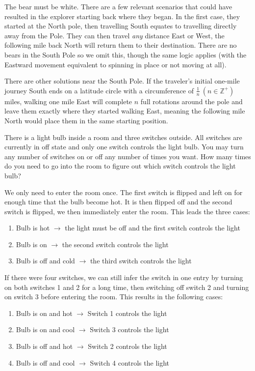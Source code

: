 \begin{solution}
The bear must be white. There are a few relevant scenarios that could have resulted in the explorer starting back where they began. In the first case, they started at the North pole, then travelling South equates to travelling directly away from the Pole. They can then travel \textit{any} distance East or West, the following mile back North will return them to their destination. There are no bears in the South Pole so we omit this, though the same logic applies (with the Eastward movement equivalent to spinning in place or not moving at all).

There are other solutions near the South Pole. If the traveler's initial one-mile journey South ends on a latitude circle with a circumference of $\frac{1}{n}\  (n \in \mathbb{Z}^+)$ miles, walking one mile East will complete $n$ full rotations around the pole and leave them exactly where they started walking East, meaning the following mile North would place them in the same starting position.
\end{solution}

\begin{problem}[Easy]
There is a light bulb inside a room and three switches outside. All switches are currently in off state and only one switch controls the light bulb. You may turn any number of switches on or off any number of times you want. How many times do you need to go into the room to figure out which switch controls the light bulb?
\end{problem}

\begin{solution}
We only need to enter the room once. The first switch is flipped and left on for enough time that the bulb become hot. It is then flipped off and the second switch is flipped, we then immediately enter the room. This leads the three cases:
\begin{enumerate}
    \item Bulb is hot $\rightarrow$ the light must be off and the first switch controls the light
    \item Bulb is on $\rightarrow$ the second switch controls the light
    \item Bulb is off and cold $\rightarrow$ the third switch controls the light
\end{enumerate}

\medskip

If there were four switches, we can still infer the switch in one entry by turning on both switches 1 and 2 for a long time, then switching off switch 2 and turning on switch 3 before entering the room. This results in the following cases:
\begin{enumerate}
    \item Bulb is on and hot $\rightarrow$ Switch 1 controls the light
    \item Bulb is on and cool $\rightarrow$ Switch 3 controls the light
    \item Bulb is off and hot $\rightarrow$ Switch 2 controls the light
    \item Bulb is off and cool $\rightarrow$ Switch 4 controls the light
\end{enumerate}
\end{solution}

